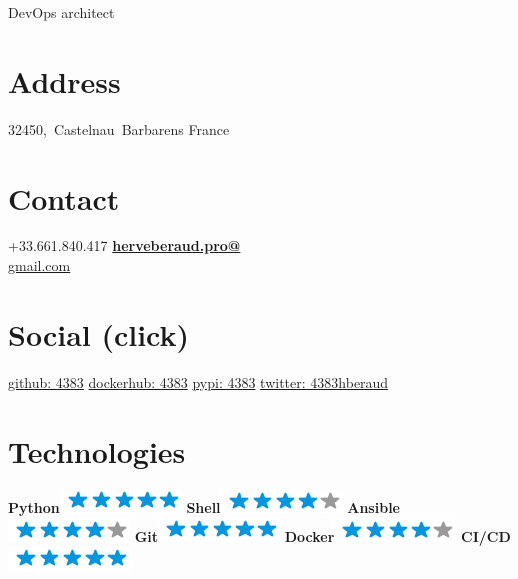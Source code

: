 \documentclass[]{friggeri-cv}
\begin{document}
{DevOps architect}


\begin{aside}
    \section{Address}
        32450,~Castelnau~Barbarens
        France
        ~
    \section{Contact}
        +33.661.840.417
        \href{mailto:herveberaud.pro@gmail.com}{\textbf{herveberaud.pro@}\\gmail.com}
        ~
    \section{Social (click)}
        \href{https://github.com/4383}{github: 4383}
        \href{https://hub.docker.com/r/4383}{dockerhub: 4383}
        \href{https://warehouse.python.org/user/4383/}{pypi: 4383}
        \href{https://twitter.com/4383hberaud}{twitter: 4383hberaud}
        ~
    \section{Technologies}
        \textbf{Python}\includegraphics[scale=0.40]{img/5stars.png}
        \textbf{Shell}\includegraphics[scale=0.40]{img/4stars.png}
        \textbf{Ansible}\includegraphics[scale=0.40]{img/4stars.png}
        \textbf{Git}\includegraphics[scale=0.40]{img/5stars.png}
        \textbf{Docker}\includegraphics[scale=0.40]{img/4stars.png}
        \textbf{CI/CD}\includegraphics[scale=0.40]{img/5stars.png}
        ~

\end{aside}
\end{document}

